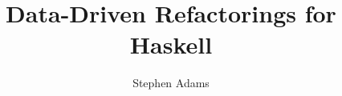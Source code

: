 

\usepackage{hyperref}

\usepackage{makeidx}


\usepackage{caption}
\usepackage{subcaption}
\setcounter{secnumdepth}{3} %

\def\fixme#1{\fbox{\textbf{\textsc{Fixme}}\quad#1}}
\def\fixpic#1{\fbox{\textbf{\textsc{Picture}}\quad#1}}
\def\defnx#1#2{\emph{#1}\index{#2}}
\def\defn#1{\defnx{#1}{#1}}
\def\floatpic#1#2{%
\begin{figure}
\texttt{[image: \#2]}
\end{figure}}
\def\inlinepic#1#2{%
\begin{center}
\texttt{[image: \#2]}
\end{center}}




\title{Data-Driven Refactorings for Haskell}
\author{Stephen Adams}
\subject{Computer Science}


